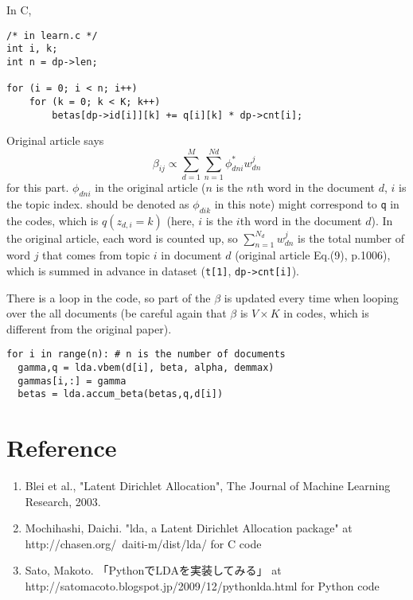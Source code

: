 \documentclass[a4paper,10.5pt,dvipdfmx]{jarticle}  %
\begin{document}
In C,
\begin{lstlisting}[style=C]
/* in learn.c */
int i, k;
int n = dp->len;

for (i = 0; i < n; i++)
	for (k = 0; k < K; k++)
		betas[dp->id[i]][k] += q[i][k] * dp->cnt[i];
\end{lstlisting}
Original article says \begin{equation} \beta_{ij} \propto \sum_{d=1}^{M} \sum_{n=1}^{Nd} \phi_{dni}^{*} w_{dn}^{j} \end{equation} for this part. $\phi_{dni}$ in the original article ($n$ is the $n$th word in the document $d$, $i$ is the topic index. should be denoted as $\phi_{dik}$ in this note) might correspond to \texttt{q} in the codes, which is $q(z_{d,i}=k)$ (here, $i$ is the $i$th word in the document $d$). In the original article, each word is counted up, so $\sum_{n=1}^{N_d} w_{dn}^{j}$ is the total number of word $j$ that comes from topic $i$ in document $d$ (original article Eq.(9), p.1006), which is summed in advance in dataset (\texttt{t[1]}, \texttt{dp->cnt[i]}).\par
There is a loop in the code, so part of the $\beta$ is updated every time when looping over the all documents (be careful again that $\beta$ is $V \times K$ in codes, which is different from the original paper).
\begin{lstlisting}[style=Python]
for i in range(n): # n is the number of documents
  gamma,q = lda.vbem(d[i], beta, alpha, demmax)
  gammas[i,:] = gamma
  betas = lda.accum_beta(betas,q,d[i])
\end{lstlisting}


\section*{Reference}
\begin{enumerate}
	\item Blei et al., "Latent Dirichlet Allocation", The Journal of Machine Learning Research, 2003.
	\item Mochihashi, Daichi. "lda, a Latent Dirichlet Allocation package" at http://chasen.org/~daiti-m/dist/lda/ for C code
	\item Sato, Makoto. 「PythonでLDAを実装してみる」 at http://satomacoto.blogspot.jp/2009/12/pythonlda.html for Python code
\end{enumerate}
\end{document}

